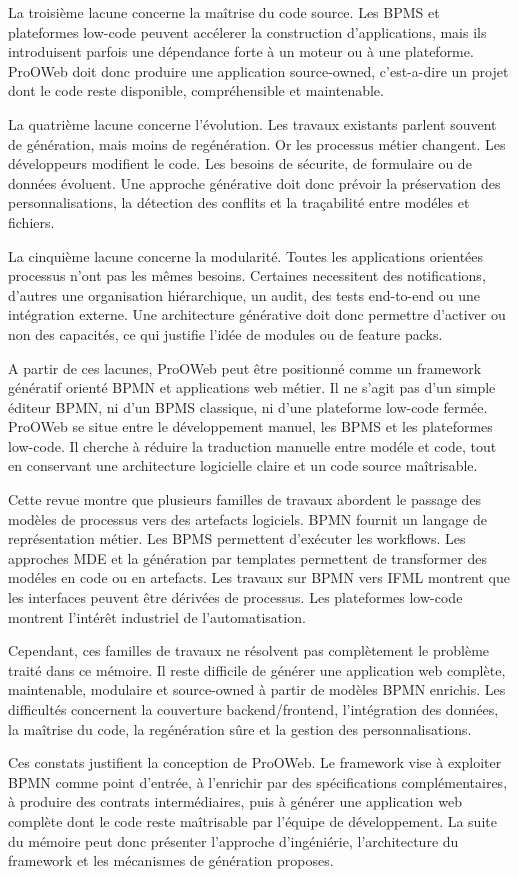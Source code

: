 La troisième lacune concerne la maîtrise du code source. Les BPMS et plateformes low-code peuvent accélerer la construction d'applications, mais ils introduisent parfois une dépendance forte à un moteur ou à une plateforme. ProOWeb doit donc produire une application source-owned, c'est-a-dire un projet dont le code reste disponible, compréhensible et maintenable.

La quatrième lacune concerne l'évolution. Les travaux existants parlent souvent de génération, mais moins de regénération. Or les processus métier changent. Les développeurs modifient le code. Les besoins de sécurite, de formulaire ou de données évoluent. Une approche générative doit donc prévoir la préservation des personnalisations, la détection des conflits et la traçabilité entre modéles et fichiers.

La cinquième lacune concerne la modularité. Toutes les applications orientées processus n'ont pas les mêmes besoins. Certaines necessitent des notifications, d'autres une organisation hiérarchique, un audit, des tests end-to-end ou une intégration externe. Une architecture générative doit donc permettre d'activer ou non des capacités, ce qui justifie l'idée de modules ou de feature packs.

A partir de ces lacunes, ProOWeb peut être positionné comme un framework génératif orienté BPMN et applications web métier. Il ne s'agit pas d'un simple éditeur BPMN, ni d'un BPMS classique, ni d'une plateforme low-code fermée. ProOWeb se situe entre le développement manuel, les BPMS et les plateformes low-code. Il cherche à réduire la traduction manuelle entre modéle et code, tout en conservant une architecture logicielle claire et un code source maîtrisable.


Cette revue montre que plusieurs familles de travaux abordent le passage des modèles de processus vers des artefacts logiciels. BPMN fournit un langage de représentation métier. Les BPMS permettent d'exécuter les workflows. Les approches MDE et la génération par templates permettent de transformer des modéles en code ou en artefacts. Les travaux sur BPMN vers IFML montrent que les interfaces peuvent être dérivées de processus. Les plateformes low-code montrent l'intérêt industriel de l'automatisation.

Cependant, ces familles de travaux ne résolvent pas complètement le problème traité dans ce mémoire. Il reste difficile de générer une application web complète, maintenable, modulaire et source-owned à partir de modèles BPMN enrichis. Les difficultés concernent la couverture backend/frontend, l'intégration des données, la maîtrise du code, la regénération sûre et la gestion des personnalisations.

Ces constats justifient la conception de ProOWeb. Le framework vise à exploiter BPMN comme point d'entrée, à l'enrichir par des spécifications complémentaires, à produire des contrats intermédiaires, puis à générer une application web complète dont le code reste maîtrisable par l'équipe de développement. La suite du mémoire peut donc présenter l'approche d'ingéniérie, l'architecture du framework et les mécanismes de génération proposes.
